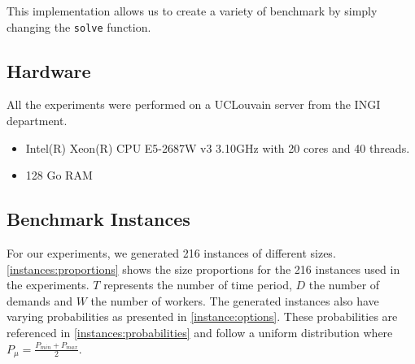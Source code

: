 \documentclass[../../thesis.tex]{subfiles}
\begin{document}
This implementation allows us to create a variety of benchmark by simply changing the \texttt{solve} function.

\subsection{Hardware}

All the experiments were performed on a UCLouvain server \cite{jabba} from the INGI department.

\begin{itemize}
  \item Intel(R) Xeon(R) CPU E5-2687W v3 \@ 3.10GHz with 20 cores and 40 threads.
  \item 128 Go RAM
\end{itemize}

\subsection{Benchmark Instances}

For our experiments, we generated 216 instances of different sizes.
\autoref{instances:proportions} shows the size proportions for the 216 instances used in the experiments. $T$ represents the number of time period, $D$ the number of demands and $W$ the number of workers. The generated instances also have varying probabilities as presented in \autoref{instance:options}. These probabilities are referenced in \autoref{instances:probabilities} and follow a uniform distribution where $P_{\mu} = \frac{P_{min} + P_{max}}{2}$.
\end{document}
